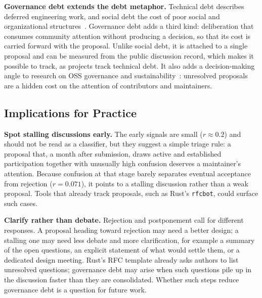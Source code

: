 \documentclass[conference]{IEEEtran}
\begin{document}
\textbf{Governance debt extends the debt metaphor.} Technical debt describes deferred engineering work, and social debt the cost of poor social and organizational structures~\cite{tamburri2013social}. Governance debt adds a third kind: deliberation that consumes community attention without producing a decision, so that its cost is carried forward with the proposal. Unlike social debt, it is attached to a single proposal and can be measured from the public discussion record, which makes it possible to track, as projects track technical debt. It also adds a decision-making angle to research on OSS governance and sustainability~\cite{yin2022open, gerosa2021shifting}: unresolved proposals are a hidden cost on the attention of contributors and maintainers.

\subsection{Implications for Practice}
\textbf{Spot stalling discussions early.} The early signals are small ($r \approx 0.2$) and should not be read as a classifier, but they suggest a simple triage rule: a proposal that, a month after submission, draws active and established participation together with unusually high confusion deserves a maintainer's attention. Because confusion at that stage barely separates eventual acceptance from rejection ($r = 0.071$), it points to a stalling discussion rather than a weak proposal. Tools that already track proposals, such as Rust's \texttt{rfcbot}, could surface such cases.

\textbf{Clarify rather than debate.} Rejection and postponement call for different responses. A proposal heading toward rejection may need a better design; a stalling one may need less debate and more clarification, for example a summary of the open questions, an explicit statement of what would settle them, or a dedicated design meeting. Rust's RFC template already asks authors to list unresolved questions; governance debt may arise when such questions pile up in the discussion faster than they are consolidated. Whether such steps reduce governance debt is a question for future work.
\end{document}
